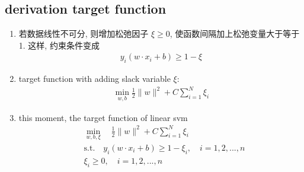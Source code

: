 \documentclass[oneside, 12pt]{ctexbook}
\begin{document}
			\subsection{\quad derivation target function}
				\begin{enumerate}
					\item 若数据线性不可分, 则增加松弛因子 $\xi \geq 0$, 使函数间隔加上松弛变量大于等于1. 这样, 约束条件变成
						\begin{align}
							y_i (w \cdot x_i + b) \geq 1 - \xi
						\end{align}
						
					\item target function with adding slack variable $\xi$:
						\begin{align}
							\min\limits_{w,b} \frac{1}{2} \parallel w \parallel ^2 + C \sum_{i=1}^{N} \xi_i
						\end{align}
						
					\item this moment, the target function of linear svm
						\begin{align}
							&\min\limits_{w,b,\xi} \quad \frac{1}{2} \parallel w \parallel ^2 + C \sum_{i=1}^{N} \xi_i\\
							&\text{s.t.} \quad y_i(w \cdot x_i + b) \geq 1 - \xi_i, \quad i=1,2,...,n\\
							&\xi_i \geq 0, \quad i=1,2,...,n
						\end{align}
				\end{enumerate}
			
\end{document}

